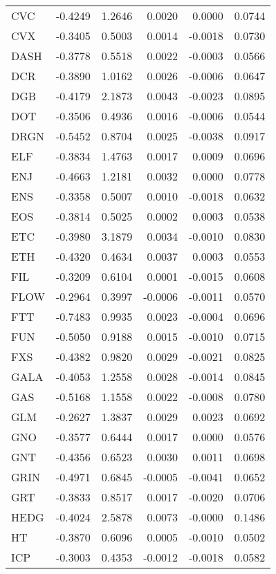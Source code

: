 \begin{table}[ht]
\begin{tabular}{lrrrrr}
CVC & -0.4249 & 1.2646 & 0.0020 & 0.0000 & 0.0744 \\
CVX & -0.3405 & 0.5003 & 0.0014 & -0.0018 & 0.0730 \\
DASH & -0.3778 & 0.5518 & 0.0022 & -0.0003 & 0.0566 \\
DCR & -0.3890 & 1.0162 & 0.0026 & -0.0006 & 0.0647 \\
DGB & -0.4179 & 2.1873 & 0.0043 & -0.0023 & 0.0895 \\
DOT & -0.3506 & 0.4936 & 0.0016 & -0.0006 & 0.0544 \\
DRGN & -0.5452 & 0.8704 & 0.0025 & -0.0038 & 0.0917 \\
ELF & -0.3834 & 1.4763 & 0.0017 & 0.0009 & 0.0696 \\
ENJ & -0.4663 & 1.2181 & 0.0032 & 0.0000 & 0.0778 \\
ENS & -0.3358 & 0.5007 & 0.0010 & -0.0018 & 0.0632 \\
EOS & -0.3814 & 0.5025 & 0.0002 & 0.0003 & 0.0538 \\
ETC & -0.3980 & 3.1879 & 0.0034 & -0.0010 & 0.0830 \\
ETH & -0.4320 & 0.4634 & 0.0037 & 0.0003 & 0.0553 \\
FIL & -0.3209 & 0.6104 & 0.0001 & -0.0015 & 0.0608 \\
FLOW & -0.2964 & 0.3997 & -0.0006 & -0.0011 & 0.0570 \\
FTT & -0.7483 & 0.9935 & 0.0023 & -0.0004 & 0.0696 \\
FUN & -0.5050 & 0.9188 & 0.0015 & -0.0010 & 0.0715 \\
FXS & -0.4382 & 0.9820 & 0.0029 & -0.0021 & 0.0825 \\
GALA & -0.4053 & 1.2558 & 0.0028 & -0.0014 & 0.0845 \\
GAS & -0.5168 & 1.1558 & 0.0022 & -0.0008 & 0.0780 \\
GLM & -0.2627 & 1.3837 & 0.0029 & 0.0023 & 0.0692 \\
GNO & -0.3577 & 0.6444 & 0.0017 & 0.0000 & 0.0576 \\
GNT & -0.4356 & 0.6523 & 0.0030 & 0.0011 & 0.0698 \\
GRIN & -0.4971 & 0.6845 & -0.0005 & -0.0041 & 0.0652 \\
GRT & -0.3833 & 0.8517 & 0.0017 & -0.0020 & 0.0706 \\
HEDG & -0.4024 & 2.5878 & 0.0073 & -0.0000 & 0.1486 \\
HT & -0.3870 & 0.6096 & 0.0005 & -0.0010 & 0.0502 \\
ICP & -0.3003 & 0.4353 & -0.0012 & -0.0018 & 0.0582 \\

\end{tabular}
\end{table}
